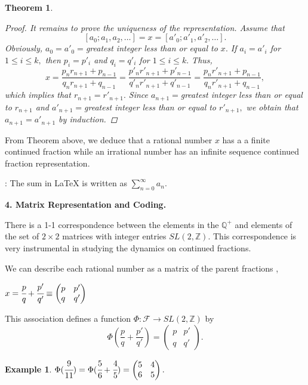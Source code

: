 \documentclass[11pt]{amsart}
\theoremstyle{plain}
\newtheorem{thm}{Theorem}
\newtheorem{exa}{Example}
\theoremstyle{definition}
\begin{document}
\begin{thm}
\begin{proof}
It remains to prove the uniqueness of the representation.  Assume that 
$$[a_0; a_1, a_2, \dots ]=x=[a'_0; a'_1, a'_2, \dots ]. $$
Obviously, $a_0=a'_0=$greatest integer less than or equal to $x. $  If $a_i=a'_i $ for $1\leq i \leq k,$
then $p_i=p'_i $ and $q_i=q'_i $ for $1\leq i \leq k. $  Thus, 
$$ x=\frac{p_n r_{n+1}+p_{n-1}}{q_n r_{n+1}+q_{n-1}}
=\frac{p'_n r'_{n+1}+p'_{n-1}}{q'_n r'_{n+1}+q'_{n-1}}
=\frac{p_n r'_{n+1}+p_{n-1}}{q_n r'_{n+1}+q_{n-1}}, $$
which implies that $r_{n+1}=r'_{n+1}. $  Since 
$a_{n+1}=$greatest integer less than or equal to $r_{n+1}$ and 
$a'_{n+1}=$greatest integer less than or equal to $r'_{n+1}, $ we obtain that
$a_{n+1}=a'_{n+1} $ by induction. 
\end{proof}
\end{thm}
\medskip

  From Theorem above, we deduce that a rational number $x$ has a a finite continued fraction while an irrational number has an infinite sequence continued fraction representation.
\medskip

: The sum in LaTeX is written as 
$\sum\limits_{n=0}^\infty a_{n}$.

\bigskip

\centerline{\bf 4. Matrix Representation and Coding.}
\medskip

There is a 1-1 correspondence between the elements in the $\mathbb Q^{+} $ and elements of the set of $2 \times 2$ matrices with integer entries $SL(2, \mathbb Z)$. This correspondence is very instrumental in studying the dynamics on continued fractions.
\medskip

We can describe each rational number as a matrix of the parent fractions \cite{Barnsley},

\begin{center}
$x=\cfrac{p}{q} + \cfrac{{p}'}{{q}'}\equiv\begin{pmatrix}
p &p' \\ 
q &q' 
\end{pmatrix}$
\end{center}

This association defines a function $\Phi : \mathcal{F} \to SL(2, \mathbb Z) $ by
$$\Phi (\frac{p}{q} + \frac{{p}'}{{q}'})= 
\begin{pmatrix} p & p' \\  q & q'  \end{pmatrix}. $$

\medskip

\begin{exa}
$\Phi (\cfrac{9}{11} )= \Phi (\cfrac{5}{6} + \cfrac{4}{5} ) =  \begin{pmatrix}
5 &4 \\ 
6 &5 
\end{pmatrix}. $
\end{exa}
\medskip
\end{document}
